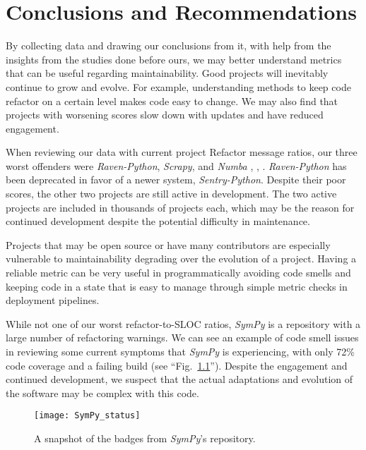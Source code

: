 \chapter{Conclusions and Recommendations} \label{chapterConclusion}


By collecting data and drawing our conclusions from it, with help from the insights from the studies done before ours, we may better understand metrics that can be useful regarding maintainability. Good projects will inevitably continue to grow and evolve. For example, understanding methods to keep code refactor on a certain level makes code easy to change. We may also find that projects with worsening scores slow down with updates and have reduced engagement.

When reviewing our data with current project Refactor message ratios, our three worst offenders were \emph{Raven-Python}, \emph{Scrapy}, and \emph{Numba} \cite{data:raven-python}, \cite{data:scrapy}, \cite{data:numba}.  \emph{Raven-Python} has been deprecated in favor of a newer system,  \emph{Sentry-Python}. Despite their poor scores, the other two projects are still active in development. The two active projects are included in thousands of projects each, which may be the reason for continued development despite the potential difficulty in maintenance.

Projects that may be open source or have many contributors are especially vulnerable to maintainability degrading over the evolution of a project. Having a reliable metric can be very useful in programmatically avoiding code smells and keeping code in a state that is easy to manage through simple metric checks in deployment pipelines.

While not one of our worst refactor-to-SLOC ratios, \emph{SymPy} is a repository with a large number of refactoring warnings. We can see an example of code smell issues in reviewing some current symptoms that \emph{SymPy} is experiencing, with only 72\% code coverage and a failing build (see ``Fig.~\ref{figSymPyStatus}''). Despite the engagement and continued development, we suspect that the actual adaptations and evolution of the software may be complex with this code.

\begin{figure}[ht]
  \centerline{
    \texttt{[image: SymPy\_status]}
  }
  \caption{A snapshot of the badges from \emph{SymPy}'s repository.}
    \label{figSymPyStatus}
\end{figure}

